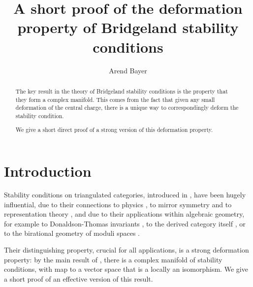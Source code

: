 \documentclass[leqno,11pt,twoside]{amsart}
\theoremstyle{definition}
\begin{document}
\title[A short proof]{A short proof of the deformation property of Bridgeland stability
conditions}

\author{Arend Bayer}
\address{School of Mathematics and Maxwell Institute,
University of Edinburgh,
James Clerk Maxwell Building,
Peter Guthrie Tait Road, Edinburgh, EH9 3FD,
United Kingdom}


\begin{abstract}
The key result in the theory of Bridgeland stability conditions is the property that they form a
complex manifold. This comes from the fact that given any small deformation of the central charge, there is a
unique way to correspondingly deform the stability condition.

We give a short direct proof of a strong version of this deformation property.
\end{abstract}

\maketitle
\setcounter{tocdepth}{1}
\tableofcontents

\section{Introduction}

Stability conditions on triangulated categories,  introduced in \cite{Bridgeland:Stab}, have
been hugely influential, due to their connections to physics \cite{Tom-Ivan:quadratic,GMN:WKB}, to
mirror symmetry \cite{Bridgeland:spaces} and to representation theory
\cite{Anno-Bezrukavnikov-Mirkovic:stability}, and due to their applications within algebraic
geometry, for example
to Donaldson-Thomas invariants \cite{Yukinobu:DTsurvey},
to the derived category itself \cite{Daniel:intro-stability, K3Pic1}, or to the birational geometry of moduli spaces
\cite{ABCH:MMP, BM:walls, wallcrossing-BrillNoether, Emolo-Benjamin:lecture-notes}.

Their distinguishing property, crucial for  all applications, is a strong deformation
property: by the main result of \cite{Bridgeland:Stab}, there is a complex manifold of stability
conditions, with map to a vector space that is a locally an isomorphism. We
give a short proof of an effective version of this result.
\end{document}
